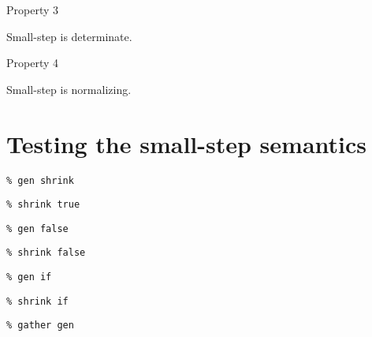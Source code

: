 \documentclass{beamer}
\begin{document}
\begin{frame}[c]
  Property 3
  \begin{center}
Small-step is determinate.
  \end{center}
\end{frame}

\begin{frame}[c]
  Property 4
  \begin{center}
Small-step is normalizing.
  \end{center}
\end{frame}

\section{Testing the small-step semantics}

\begin{frame}[fragile]
  \begin{verbatim}
% gen shrink
  \end{verbatim}
\end{frame}

\begin{frame}[fragile]
  \begin{verbatim}
% shrink true
  \end{verbatim}
\end{frame}

\begin{frame}[fragile]
  \begin{verbatim}
% gen false
  \end{verbatim}
\end{frame}

\begin{frame}[fragile]
  \begin{verbatim}
% shrink false
  \end{verbatim}
\end{frame}

\begin{frame}[fragile]
  \begin{verbatim}
% gen if
  \end{verbatim}
\end{frame}

\begin{frame}[fragile]
  \begin{verbatim}
% shrink if
  \end{verbatim}
\end{frame}

\begin{frame}[fragile]
  \begin{verbatim}
% gather gen
  \end{verbatim}
\end{frame}
\end{document}
